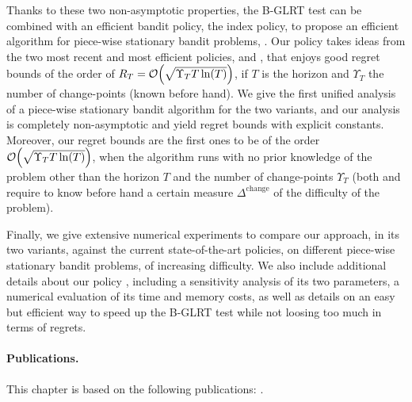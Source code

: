Thanks to these two non-asymptotic properties, the B-GLRT test can be combined with an efficient bandit policy, the \klUCB{} index policy, to propose an efficient algorithm for piece-wise stationary bandit problems, \GLRklUCB.
Our policy takes ideas from the two most recent and most efficient policies, \CUSUMUCB{} and \MUCB, that enjoys good regret bounds of the order of $R_T = \mathop{}\mathopen{}\mathcal{O}\mathopen{}\left(\sqrt{\Upsilon_T T \ln(T)}\right)$, if $T$ is the horizon and $\Upsilon_T$ the number of change-points (known before hand).
%
We give the first unified analysis of a piece-wise stationary bandit algorithm for the two variants, and our analysis is completely non-asymptotic and yield regret bounds with explicit constants.
Moreover, our regret bounds are the first ones to be of the order $\mathop{}\mathopen{}\mathcal{O}\mathopen{}\left(\sqrt{\Upsilon_T T \ln(T)}\right)$, when the algorithm runs with no prior knowledge of the problem other than the horizon $T$ and the number of change-points $\Upsilon_T$ (both \MUCB{} and \CUSUMUCB{} require to know before hand a certain measure $\Delta^{\text{change}}$ of the difficulty of the problem).

Finally, we give extensive numerical experiments to compare our approach, in its two variants, against the current state-of-the-art policies, on different piece-wise stationary bandit problems, of increasing difficulty.
%
We also include additional details about our policy \GLRklUCB, including a sensitivity analysis of its two parameters, a numerical evaluation of its time and memory costs, as well as details on an easy but efficient way to speed up the B-GLRT test while not loosing too much in terms of regrets.



\paragraph{Publications.}
%
This chapter is based on the following publications: \cite{Besson2019GLRT,Besson2019Gretsi}.


\graphicspath{{2-Chapters/6-Chapter/Images/}}


